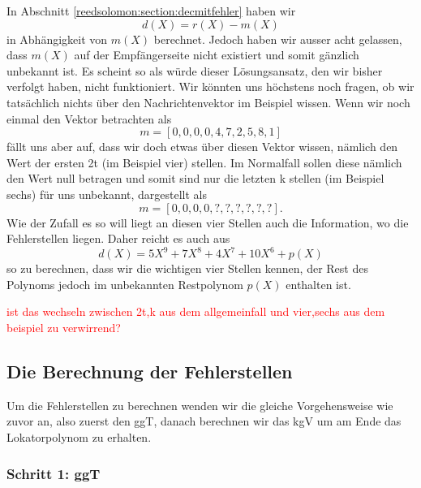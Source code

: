 In Abschnitt \ref{reedsolomon:section:decmitfehler} haben wir
\[
d(X) = r(X) - m(X)
\]
in Abhängigkeit von $m(X)$ berechnet. 
Jedoch haben wir ausser acht gelassen, dass $m(X)$ auf der Empfängerseite nicht existiert und somit gänzlich unbekannt ist.
Es scheint so als würde dieser Lösungsansatz, den wir bisher verfolgt haben, nicht funktioniert.
Wir könnten uns höchstens noch fragen, ob wir tatsächlich nichts über den Nachrichtenvektor im Beispiel wissen. Wenn wir noch einmal den Vektor betrachten als
\[
m = [0,0,0,0,4,7,2,5,8,1]
\]
fällt uns aber auf, dass wir doch etwas über diesen Vektor wissen, nämlich den Wert der ersten 2t (im Beispiel vier) stellen.
Im Normalfall sollen diese nämlich den Wert null betragen und somit sind nur die letzten k stellen (im Beispiel sechs) für uns unbekannt, dargestellt als
\[
m = [0,0,0,0,?,?,?,?,?,?].
\]
Wie der Zufall es so will liegt an diesen vier Stellen auch die Information, wo die Fehlerstellen liegen. Daher reicht es auch aus
\[
d(X) = 5X^9 + 7X^8 + 4X^7 + 10X^6 + p(X)
\]
so zu berechnen, dass wir die wichtigen vier Stellen kennen, der Rest des Polynoms jedoch im unbekannten Restpolynom $p(X)$ enthalten ist. 

\textcolor{red}{ist das wechseln zwischen 2t,k aus dem allgemeinfall und vier,sechs aus dem beispiel zu verwirrend?}

\subsection{Die Berechnung der Fehlerstellen
	\label{reedsolomon:subsection:nachrichtenvektor}}

Um die Fehlerstellen zu berechnen wenden wir die gleiche Vorgehensweise wie zuvor an, also zuerst den ggT, danach berechnen wir das kgV um am Ende das Lokatorpolynom zu erhalten.

\subsubsection{Schritt 1: ggT}

